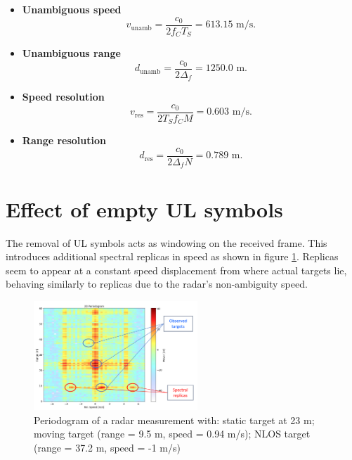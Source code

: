 \begin{itemize}
    \item \textbf{Unambiguous speed}
     \vspace{-\baselineskip} %
            \begin{equation}
                v_{\text{unamb}} = \frac{c_0}{2f_C T_S} = 613.15\text{ m/s}.
            \end{equation}
           
     \item \textbf{Unambiguous range}
            \begin{equation}
                d_{\text{unamb}} = \frac{c_0}{2\Delta_f} = 1250.0\text{ m}.
            \end{equation}
     \item \textbf{Speed resolution}
            \begin{equation}
                v_{\text{res}} = \frac{c_0}{2T_Sf_CM} = 0.603 \text{ m/s}.
            \end{equation} 
     \item \textbf{Range resolution}
            \begin{equation}
                d_{\text{res}} = \frac{c_0}{2\Delta_fN} = 0.789 \text{ m}.
            \end{equation}  
\end{itemize}



\section{Effect of empty UL symbols}
    
    The removal of UL symbols acts as windowing on the received frame. This introduces additional spectral replicas in speed as shown in figure \ref{fig:SpectralReplicasDLULpattern}. Replicas seem to appear at a constant speed displacement from where actual targets lie, behaving similarly to replicas due to the radar's non-ambiguity speed.
    
    \begin{figure}[H]
        \centering
        \includegraphics[width=0.55\textwidth]{Images/TDDprocessing/SpectralReplicasDLULpattern.png}
        \caption{Periodogram of a radar measurement with: static target at 23 m; moving target (range = 9.5 m, speed = 0.94 m/s); NLOS target (range = 37.2 m, speed = -1 m/s)}
        \label{fig:SpectralReplicasDLULpattern}
    \end{figure}
    
